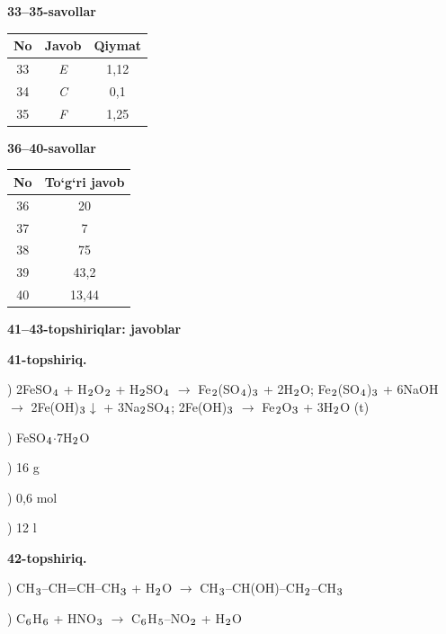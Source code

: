 \documentclass[11pt,a4paper]{article}
\renewcommand{\textsubscript}[1]{\ensuremath{_{\text{\fontsize{8}{8}\selectfont #1}}}}
\begin{document}
\noindent\textbf{33--35-savollar}\par\smallskip
\noindent\begin{tabular}{|c|c|c|}\hline \textbf{No} & \textbf{Javob} & \textbf{Qiymat}\\\hline
33 & \textsl{E} & 1,12\\\hline
34 & \textsl{C} & 0,1\\\hline
35 & \textsl{F} & 1,25\\\hline
\end{tabular}\par\medskip
\noindent\textbf{36--40-savollar}\par\smallskip
\noindent\begin{tabular}{|c|c|}\hline \textbf{No} & \textbf{To`g`ri javob}\\\hline
36 & 20\\\hline
37 & 7\\\hline
38 & 75\\\hline
39 & 43,2\\\hline
40 & 13,44\\\hline
\end{tabular}\par\medskip
\noindent\textbf{41--43-topshiriqlar: javoblar}\par\smallskip
\noindent\textbf{41-topshiriq.}\par
{}) 2FeSO\textsubscript{4} + H\textsubscript{2}O\textsubscript{2} + H\textsubscript{2}SO\textsubscript{4} $\to$ Fe\textsubscript{2}(SO\textsubscript{4})\textsubscript{3} + 2H\textsubscript{2}O; Fe\textsubscript{2}(SO\textsubscript{4})\textsubscript{3} + 6NaOH $\to$ 2Fe(OH)\textsubscript{3}$\downarrow$ + 3Na\textsubscript{2}SO\textsubscript{4}; 2Fe(OH)\textsubscript{3} $\to$ Fe\textsubscript{2}O\textsubscript{3} + 3H\textsubscript{2}O (t)\par
{}) FeSO\textsubscript{4}$\cdot$7H\textsubscript{2}O\par
{}) 16 g\par
{}) 0,6 mol\par
{}) 12 l\par
\noindent\textbf{42-topshiriq.}\par
{}) CH\textsubscript{3}--CH=CH--CH\textsubscript{3} + H\textsubscript{2}O $\to$ CH\textsubscript{3}--CH(OH)--CH\textsubscript{2}--CH\textsubscript{3}\par
{}) C\textsubscript{6}H\textsubscript{6} + HNO\textsubscript{3} $\to$ C\textsubscript{6}H\textsubscript{5}--NO\textsubscript{2} + H\textsubscript{2}O\par
\end{document}

